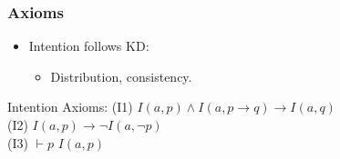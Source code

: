 \documentclass[aspectratio=169]{beamer}
\begin{document}
\begin{frame}
\frametitle{Axioms}
\Large 
\begin{itemize}
    \item Intention follows KD:
    \begin{itemize}
        \Large 
        \item Distribution, consistency.
    \end{itemize}
\end{itemize}
\begin{block}{Intention Axioms:}
    \Large
    \normalfont
    (I1) $I(a, p) \wedge I(a, p \rightarrow q) \rightarrow I(a, q)$ \\
    (I2) $I(a, p) \rightarrow \neg I(a, \neg p)$ \\
    (I3)  $\vdash p$  $I(a, p)$
\end{block}
\end{frame}


\end{document}

